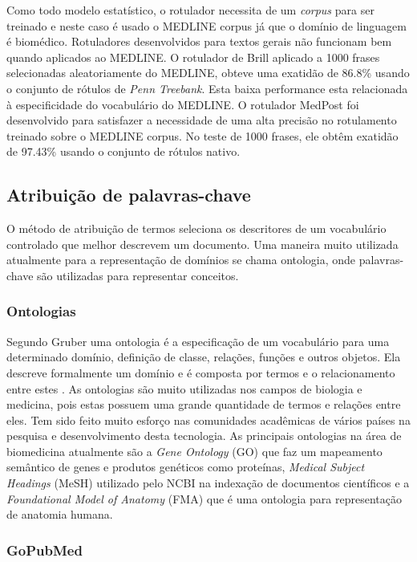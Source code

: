 Como todo modelo estatístico, o rotulador necessita de um \emph{corpus} para ser treinado e neste caso é usado o MEDLINE corpus já que o domínio de linguagem é biomédico. Rotuladores desenvolvidos para textos gerais não funcionam bem quando aplicados ao MEDLINE. O rotulador de Brill \cite{Brill1992} aplicado a 1000 frases selecionadas aleatoriamente do MEDLINE, obteve uma exatidão de 86.8\% usando o conjunto de rótulos de \emph{Penn Treebank}. Esta baixa performance esta relacionada à especificidade do vocabulário do MEDLINE. O rotulador MedPost\cite{Smith2004} foi desenvolvido para satisfazer a necessidade de uma alta precisão no rotulamento treinado sobre o MEDLINE corpus. No teste de 1000 frases, ele obtêm exatidão de 97.43\% usando o conjunto de rótulos nativo.

\subsection{Atribuição de palavras-chave}
O método de atribuição de termos seleciona os descritores de um vocabulário controlado que melhor descrevem um documento. Uma maneira muito utilizada atualmente para a representação de domínios se chama ontologia, onde palavras-chave são utilizadas para representar conceitos.

\subsubsection{Ontologias}

 Segundo Gruber \cite{Gruber1993} uma ontologia é a especificação de um vocabulário para uma determinado domínio, definição de classe, relações, funções e outros objetos. Ela descreve formalmente um domínio e é composta por termos e o relacionamento entre estes \cite{Antoniou2004}. As ontologias são muito utilizadas nos campos de biologia e medicina, pois estas possuem uma grande quantidade de termos e relações entre eles. Tem sido feito muito esforço nas comunidades acadêmicas de vários países na pesquisa e desenvolvimento desta tecnologia. As principais ontologias na área de biomedicina atualmente são a \emph{Gene Ontology} (GO) \cite{GO2000} que faz um mapeamento semântico de genes e produtos genéticos como proteínas, \emph{Medical Subject Headings} (MeSH) \cite{MESH2000} utilizado pelo NCBI na indexação de documentos científicos e a \emph{Foundational Model of Anatomy}  (FMA) \cite{FMA2003} que é uma ontologia para representação de anatomia humana.

\subsubsection{GoPubMed}

